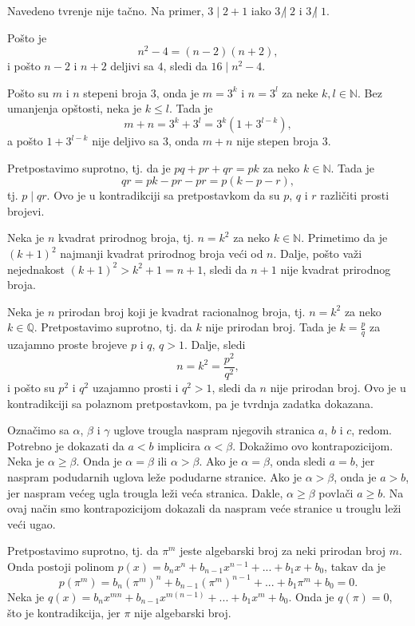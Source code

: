 Navedeno tvr\dj enje nije ta\v cno. Na primer, $3\mid 2+1$ iako $3\mathrel{\not|} 2$ i $3\mathrel{\not|} 1$.

Po\v sto je
\[n^2-4=(n-2)(n+2),\]
i po\v sto $n-2$ i $n+2$ deljivi sa $4$, sledi da $16\mid n^2-4$.

Po\v sto su $m$ i $n$ stepeni broja $3$, onda je $m=3^k$ i $n=3^l$ za neke $k,l\in\mathbb N$. Bez umanjenja op\v stosti, neka je $k\leq l$. Tada je
\[ m+n=3^k+3^l=3^k(1+3^{l-k}), \]
a po\v sto $1+3^{l-k}$ nije deljivo sa $3$, onda $m+n$ nije stepen broja $3$.

Pretpostavimo suprotno, tj. da je $pq+pr+qr=pk$ za neko $k\in\mathbb N$. Tada je
\[ qr=pk-pr-pr=p(k-p-r), \]
tj. $p\mid qr$. Ovo je u kontradikciji sa pretpostavkom da su $p$, $q$ i $r$ razli\v citi prosti brojevi.

Neka je $n$ kvadrat prirodnog broja, tj. $n=k^2$ za neko $k\in\mathbb N$. Primetimo da je $(k+1)^2$ najmanji kvadrat prirodnog broja ve\' ci od $n$. Dalje, po\v sto va\v zi nejednakost $(k+1)^2>k^2+1=n+1$, sledi da $n+1$ nije kvadrat prirodnog broja.

Neka je $n$ prirodan broj koji je kvadrat racionalnog broja, tj. $n=k^2$ za neko $k\in\mathbb Q$. Pretpostavimo suprotno, tj. da $k$ nije prirodan broj. Tada je $k=\frac pq$ za uzajamno proste brojeve $p$ i $q$, $q>1$. Dalje, sledi
\[n=k^2=\frac{p^2}{q^2},\]
i po\v sto su $p^2$ i $q^2$ uzajamno prosti i $q^2>1$, sledi da $n$ nije prirodan broj. Ovo je u kontradikciji sa polaznom pretpostavkom, pa je tvrdnja zadatka dokazana.

Ozna\v cimo sa $\alpha$, $\beta$ i $\gamma$ uglove trougla naspram njegovih stranica $a$, $b$ i $c$, redom. Potrebno je dokazati da $a<b$ implicira $\alpha<\beta$. Doka\v zimo ovo kontrapozicijom.  Neka je $\alpha\geq\beta$. Onda je $\alpha=\beta$ ili $\alpha>\beta$. Ako je $\alpha=\beta$, onda sledi $a=b$, jer naspram podudarnih uglova le\v ze podudarne stranice. Ako je $\alpha>\beta$, onda je $a>b$, jer naspram ve\' ceg ugla trougla le\v zi ve\' ca stranica. Dakle, $\alpha\geq\beta$ povla\v ci $a\geq b$. Na ovaj na\v cin smo kontrapozicijom dokazali da naspram ve\' ce stranice u trouglu le\v zi ve\' ci ugao.

Pretpostavimo suprotno, tj. da $\pi^m$ jeste algebarski broj za neki prirodan broj $m$. Onda postoji polinom $p(x)=b_nx^n+b_{n-1}x^{n-1}+...+b_1x+b_0$, takav da je
\[p(\pi^m)=b_n(\pi^m)^n+b_{n-1}(\pi^m)^{n-1}+...+b_1\pi^m+b_0=0.\]
Neka je $q(x)=b_n x^{mn}+b_{n-1}x^{m(n-1)}+...+b_1x^m+b_0$. Onda je $q(\pi)=0$, \v sto je kontradikcija, jer $\pi$ nije algebarski broj.

